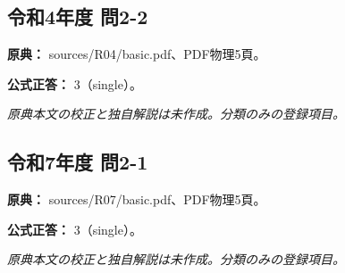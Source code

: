 \subsection{令和4年度 問2-2}
\label{q:r04-reg-basic-2-2}

\noindent\textbf{原典：} sources/R04/basic.pdf、PDF物理5頁。

\textbf{公式正答：} 3（single）。

\par\textit{原典本文の校正と独自解説は未作成。分類のみの登録項目。}

\subsection{令和7年度 問2-1}
\label{q:r07-reg-basic-2-1}

\noindent\textbf{原典：} sources/R07/basic.pdf、PDF物理5頁。

\textbf{公式正答：} 3（single）。

\par\textit{原典本文の校正と独自解説は未作成。分類のみの登録項目。}
